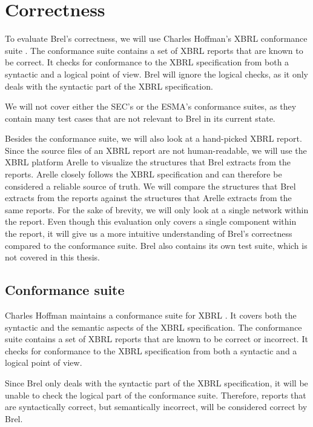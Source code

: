 \section{Correctness}
\label{sec:correctness}

To evaluate Brel's correctness, we will use Charles Hoffman's XBRL conformance suite \cite{hoffman_conformance_suite}.
The conformance suite contains a set of XBRL reports that are known to be correct.
It checks for conformance to the XBRL specification from both a syntactic and a logical point of view.
Brel will ignore the logical checks, as it only deals with the syntactic part of the XBRL specification.

We will not cover either the SEC's or the ESMA's conformance suites, 
as they contain many test cases that are not relevant to Brel in its current state.

Besides the conformance suite, we will also look at a hand-picked XBRL report.
Since the source files of an XBRL report are not human-readable, 
we will use the XBRL platform Arelle\cite{arelle} to visualize the structures that Brel extracts from the reports.
Arelle closely follows the XBRL specification and can therefore be considered a reliable source of truth.
We will compare the structures that Brel extracts from the reports against the structures that Arelle extracts from the same reports.
For the sake of brevity, we will only look at a single network within the report.
Even though this evaluation only covers a single component within the report,
it will give us a more intuitive understanding of Brel's correctness compared to the conformance suite.
Brel also contains its own test suite, which is not covered in this thesis.

\subsection{Conformance suite}

Charles Hoffman maintains a conformance suite for XBRL \cite{hoffman_conformance_suite}.
It covers both the syntactic and the semantic aspects of the XBRL specification.
The conformance suite contains a set of XBRL reports that are known to be correct or incorrect.
It checks for conformance to the XBRL specification from both a syntactic and a logical point of view.

Since Brel only deals with the syntactic part of the XBRL specification, 
it will be unable to check the logical part of the conformance suite.
Therefore, reports that are syntactically correct, but semantically incorrect, will be considered correct by Brel.

